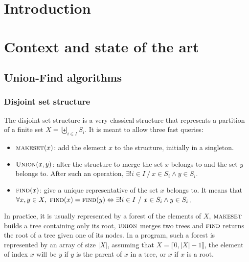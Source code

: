 \documentclass[12px]{article}
\begin{document}
  \section{Introduction}

  \section{Context and state of the art}
    \subsection{Union-Find algorithms}
      \subsubsection{Disjoint set structure}
        The disjoint set structure is a very classical structure that represents a partition of a finite set $X = \biguplus\limits_{i \in I} S_i$. It is meant to allow three fast queries:
        \begin{itemize}
          \item $\Call{makeset}{x}$: add the element $x$ to the structure, initially in a singleton.
          \item $\Call{Union}{x, y}$: alter the structure to merge the set $x$ belongs to and the set $y$ belongs to. After such an operation, $\exists! i \in I~/~x \in S_i \land y \in S_i$.
          \item $\Call{find}{x}$: give a unique representative of the set $x$ belongs to. It means that $\forall x, y \in X,~\Call{find}{x} = \Call{find}{y} \Leftrightarrow \exists! i \in I~/~x \in S_i \land y \in S_i$.
        \end{itemize}

        In practice, it is usually represented by a forest of the elements of $X$, $\textsc{makeset}$ builds a tree containing only its root, $\textsc{union}$ merges two trees and $\textsc{find}$ returns the root of a tree given one of its nodes.
        In a program, such a forest is represented by an array of size $|X|$, assuming that $X = \llbracket 0, |X|-1 \rrbracket$, the element of index $x$ will be $y$ if $y$ is the parent of $x$ in a tree, or $x$ if $x$ is a root.
\end{document}
